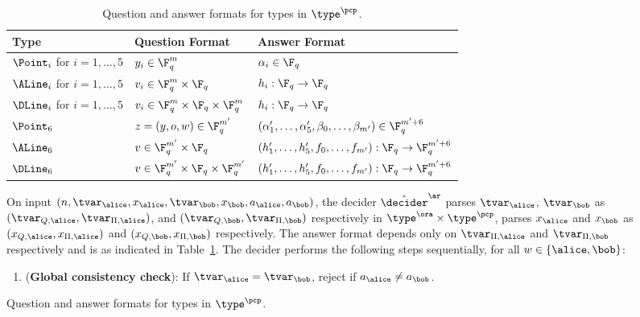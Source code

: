 \begin{figure}[!htb]
  \begin{gamespec}
  {
  \small
    \begin{table}[H]
      \centering
      \small
      \begin{tabularx}{\textwidth}{ l l X }
        \toprule
        Type & Question Format & Answer Format \\
        \midrule
        $\Point_i$ for $i=1, \ldots, 5$ & $y_i \in \F_q^m$ &
        $\alpha_i \in \F_q$ \\
        $\ALine_i$ for $i=1, \ldots, 5$ & $v_i \in \F_q^m \times \F_q$ &
        $h_i: \F_q \to \F_q$ \\
        $\DLine_i$ for $i=1, \ldots, 5$ & $v_i \in \F_q^m \times \F_q \times \F_q^m$ &
        $h_i: \F_q \to \F_q$ \\        
        $\Point_6$ & $z = (y, o, w) \in \F_q^{m'}$ & $(\alpha'_1, \ldots,
        \alpha'_5, \beta_0, \ldots, \beta_{m'}) \in \F_q^{m'+6}$\\
        $\ALine_6$ & $v \in \F_q^{m'} \times \F_q$ & $(h'_1, \dots,
        h'_5, f_0, \dots, f_{m'}): \F_q \to \F_q^{m' + 6}$ \\
        $\DLine_6$ & $v \in \F_q^{m'} \times \F_q \times \F_q^{m'}$ & $(h'_1, \dots,
        h'_5, f_0, \dots, f_{m'}): \F_q \to \F_q^{m' + 6}$ \\        
        \bottomrule
      \end{tabularx}
      \caption{Question and answer formats for types in $\type^\pcp$.}\label{table:tpcp}
    \end{table}

    On input $(n, \tvar_\alice, x_\alice, \tvar_\bob, x_\bob, a_\alice,
    a_\bob)$, the decider $\tdans$ parses $\tvar_\alice$, $\tvar_\bob$ as
    $(\tvar_{Q,\alice}, \tvar_{\Pi, \alice})$, and $(\tvar_{Q,\bob},
    \tvar_{\Pi,\bob})$ respectively in $ \type^\ora \times \type^\pcp$, parses
    $x_\alice$ and $x_\bob$ as $(x_{Q,\alice}, x_{\Pi,\alice})$ and
    $(x_{Q,\bob}, x_{\Pi,\bob})$ respectively. The answer format depends only on $\tvar_{\Pi, \alice}$ and $\tvar_{\Pi, \bob}$ respectively and is as indicated in Table~\ref{table:tpcp}.  
    The decider performs the following steps sequentially, for all
    $w\in\{\alice,\bob\}$:
    \begin{enumerate}
    \item (\textbf{Global consistency check}): If $\tvar_{\alice} =
      \tvar_{\bob}$, reject if $a_\alice\neq a_\bob$.
      \label{enu:ar-global-consistency}


\end{enumerate}}
\end{gamespec}
\end{figure}

